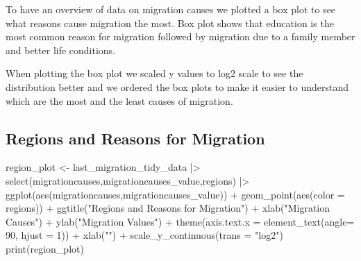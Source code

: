 \documentclass[
  11pt,
  a4paper,
  DIV=11,
  numbers=noendperiod]{scrartcl}
\newenvironment{Shaded}{\begin{snugshade}}{\end{snugshade}}
\newcommand{\AttributeTok}[1]{\textcolor[rgb]{0.40,0.45,0.13}{#1}}
\newcommand{\DecValTok}[1]{\textcolor[rgb]{0.68,0.00,0.00}{#1}}
\newcommand{\FunctionTok}[1]{\textcolor[rgb]{0.28,0.35,0.67}{#1}}
\newcommand{\NormalTok}[1]{\textcolor[rgb]{0.00,0.23,0.31}{#1}}
\newcommand{\OtherTok}[1]{\textcolor[rgb]{0.00,0.23,0.31}{#1}}
\newcommand{\SpecialCharTok}[1]{\textcolor[rgb]{0.37,0.37,0.37}{#1}}
\newcommand{\StringTok}[1]{\textcolor[rgb]{0.13,0.47,0.30}{#1}}
\begin{document}
To have an overview of data on migration causes we plotted a box plot to
see what reasons cause migration the most. Box plot shows that education
is the most common reason for migration followed by migration due to a
family member and better life conditions.

When plotting the box plot we scaled y values to log2 scale to see the
distribution better and we ordered the box plots to make it easier to
understand which are the most and the least causes of migration.

\hypertarget{regions-and-reasons-for-migration}{%
\subsection{Regions and Reasons for
Migration}\label{regions-and-reasons-for-migration}}

\begin{Shaded}
\begin{Highlighting}[]
\NormalTok{region\_plot }\OtherTok{\textless{}{-}}\NormalTok{ last\_migration\_tidy\_data }\SpecialCharTok{|\textgreater{}} \FunctionTok{select}\NormalTok{(migrationcauses,migrationcauses\_value,regions) }\SpecialCharTok{|\textgreater{}}
  \FunctionTok{ggplot}\NormalTok{(}\FunctionTok{aes}\NormalTok{(migrationcauses,migrationcauses\_value)) }\SpecialCharTok{+} \FunctionTok{geom\_point}\NormalTok{(}\FunctionTok{aes}\NormalTok{(}\AttributeTok{color =}\NormalTok{ regions)) }\SpecialCharTok{+}
  \FunctionTok{ggtitle}\NormalTok{(}\StringTok{"Regions and Reasons for Migration"}\NormalTok{) }\SpecialCharTok{+} \FunctionTok{xlab}\NormalTok{(}\StringTok{"Migration Causes"}\NormalTok{) }\SpecialCharTok{+}
  \FunctionTok{ylab}\NormalTok{(}\StringTok{"Migration Values"}\NormalTok{) }\SpecialCharTok{+} \FunctionTok{theme}\NormalTok{(}\AttributeTok{axis.text.x =} \FunctionTok{element\_text}\NormalTok{(}\AttributeTok{angle=} \DecValTok{90}\NormalTok{, }\AttributeTok{hjust =} \DecValTok{1}\NormalTok{)) }\SpecialCharTok{+} \FunctionTok{xlab}\NormalTok{(}\StringTok{""}\NormalTok{) }\SpecialCharTok{+} \FunctionTok{scale\_y\_continuous}\NormalTok{(}\AttributeTok{trans =} \StringTok{"log2"}\NormalTok{)  }
\FunctionTok{print}\NormalTok{(region\_plot)}
\end{Highlighting}
\end{Shaded}
\end{document}
